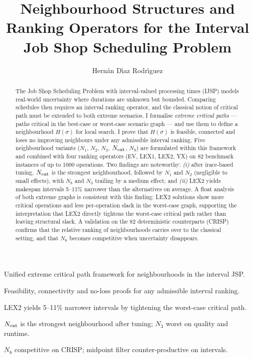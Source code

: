 \documentclass[preprint,12pt]{elsarticle}
\begin{document}
\begin{frontmatter}


\title{Neighbourhood Structures and Ranking Operators for the Interval Job Shop Scheduling Problem}

\author[uo]{Hern\'an D\'{\i}az Rodr\'{\i}guez}


\begin{abstract}
The Job Shop Scheduling Problem with interval-valued processing times (IJSP) models real-world uncertainty where durations are unknown but bounded. Comparing schedules then requires an interval ranking operator, and the classical notion of critical path must be extended to both extreme scenarios. I formalise \emph{extreme critical paths} --- paths critical in the best-case or worst-case scenario graph --- and use them to define a neighbourhood $H(\sigma)$ for local search. I prove that $H(\sigma)$ is feasible, connected and loses no improving neighbours under any admissible interval ranking. Five neighbourhood variants ($N_1$, $N_2$, $N_3$, $N_{\rm ext}$, $N_8$) are formulated within this framework and combined with four ranking operators (EV, LEX1, LEX2, YX) on 82 benchmark instances of up to 1000 operations. Two findings are noteworthy: \emph{(i)} after irace-based tuning, $N_{\rm ext}$ is the strongest neighbourhood, followed by $N_1$ and $N_2$ (negligible to small effects), with $N_8$ and $N_3$ trailing by a medium effect; and \emph{(ii)} LEX2 yields makespan intervals 5--11\% narrower than the alternatives on average. A float analysis of both extreme graphs is consistent with this finding: LEX2 solutions show more critical operations and less per-operation slack in the worst-case graph, supporting the interpretation that LEX2 directly tightens the worst-case critical path rather than leaving structural slack. A validation on the 82 deterministic counterparts (CRISP) confirms that the relative ranking of neighbourhoods carries over to the classical setting, and that $N_8$ becomes competitive when uncertainty disappears.
\end{abstract}


\begin{highlights}
\item Unified extreme critical path framework for neighbourhoods in the interval JSP.
\item Feasibility, connectivity and no-loss proofs for any admissible interval ranking.
\item LEX2 yields 5--11\% narrower intervals by tightening the worst-case critical path.
\item $N_{\rm ext}$ is the strongest neighbourhood after tuning; $N_3$ worst on quality and runtime.
\item $N_8$ competitive on CRISP; midpoint filter counter-productive on intervals.
\end{highlights}


\end{frontmatter}
\end{document}
